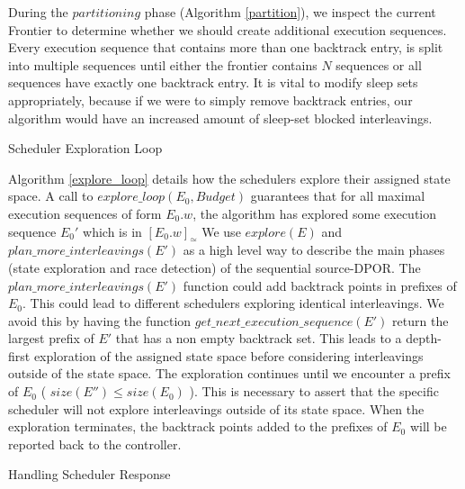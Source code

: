 During the $partitioning$ phase (Algorithm \ref{partition}), we inspect the current Frontier to determine whether
we should create additional execution sequences. Every execution sequence that contains more than one backtrack entry,
is split into multiple sequences until either the frontier contains $N$ sequences or all sequences
have exactly one backtrack entry. It is vital to modify sleep sets appropriately, because if we were to simply
remove backtrack entries, our algorithm would have an increased amount of sleep-set blocked interleavings.

\begin{algorithm}
    \caption{Scheduler Exploration Loop}
    \label{explore_loop}
\end{algorithm}

Algorithm \ref{explore_loop} details how the schedulers explore their assigned state space.
A call to $explore\_loop(E_0, Budget)$ guarantees that for all maximal execution 
sequences of form $E_0.w$, the algorithm has explored some execution sequence $E_0'$ which is in $[E_0.w]_\simeq$ 
We use $explore(E)$ and 
$ plan\_more\_interleavings(E') $ as a high level way to describe the main phases (state exploration and 
race detection) of the sequential source-DPOR. The $ plan\_more\_interleavings(E') $ function
could add backtrack points in prefixes of $E_0$. This could lead to different schedulers exploring
identical interleavings. We avoid this by having 
the function $ get\_next\_execution\_sequence(E')$ return 
the largest prefix of $E'$ that has a non empty backtrack set. This leads to a depth-first exploration of the assigned
state space before considering interleavings outside of the state space. The exploration
continues until we encounter a prefix of $E_0$ ( $size(E'') \leq size(E_0)$ ). This is necessary to 
assert that the specific scheduler will not explore interleavings outside of its state space. When the exploration
terminates, the backtrack points added to the prefixes of $E_0$ will be reported back to the controller.

\begin{algorithm}
    \caption{Handling Scheduler Response}
    \label{response}
\end{algorithm}


